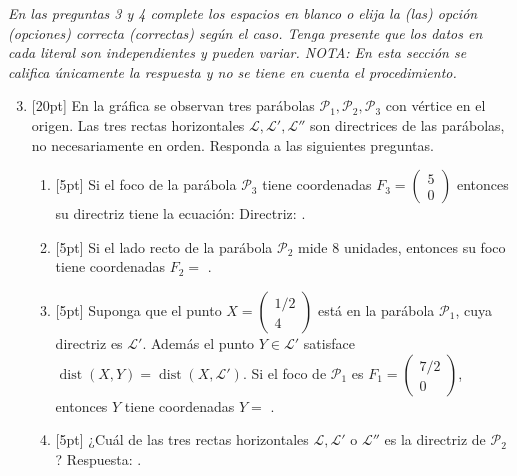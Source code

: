 \documentclass[11pt]{article}
\newcommand{\vect}[2]{\begin{pmatrix}#1\\#2\end{pmatrix}}
\newcommand{\nota}[1]{{\small\itshape\color{unalblue!70!black} #1}}
\begin{document}
\vspace{6pt}
\nota{En las preguntas 3 y 4 complete los espacios en blanco o elija la (las) opción (opciones) correcta (correctas) según el caso. Tenga presente que los datos en cada literal son independientes y pueden variar. NOTA: En esta sección se califica únicamente la respuesta y no se tiene en cuenta el procedimiento.}

\begin{enumerate}
\setcounter{enumi}{2}
\item{}[20pt] En la gráfica se observan tres parábolas $\mathcal{P}_1,\mathcal{P}_2,\mathcal{P}_3$ con vértice en el origen. Las tres rectas horizontales $\mathcal{L},\mathcal{L}',\mathcal{L}''$ son directrices de las parábolas, no necesariamente en orden. Responda a las siguientes preguntas.

\begin{center}
\end{center}

\begin{enumerate}[label=(\alph*)]
\item{}[5pt] Si el foco de la parábola $\mathcal{P}_3$ tiene coordenadas $F_3=\vect{5}{0}$ entonces su directriz tiene la ecuación: Directriz: \underline{\hspace{4cm}}.
\item{}[5pt] Si el lado recto de la parábola $\mathcal{P}_2$ mide 8 unidades, entonces su foco tiene coordenadas $F_2=$ \underline{\hspace{3cm}}.
\item{}[5pt] Suponga que el punto $X=\vect{1/2}{4}$ está en la parábola $\mathcal{P}_1$, cuya directriz es $\mathcal{L}'$. Además el punto $Y\in\mathcal{L}'$ satisface $\operatorname{dist}(X,Y)=\operatorname{dist}(X,\mathcal{L}')$. Si el foco de $\mathcal{P}_1$ es $F_1=\vect{7/2}{0}$, entonces $Y$ tiene coordenadas $Y=$ \underline{\hspace{3cm}}.
\item{}[5pt] ¿Cuál de las tres rectas horizontales $\mathcal{L},\mathcal{L}'$ o $\mathcal{L}''$ es la directriz de $\mathcal{P}_2$? Respuesta: \underline{\hspace{2.5cm}}.
\end{enumerate}


\end{enumerate}
\end{document}
